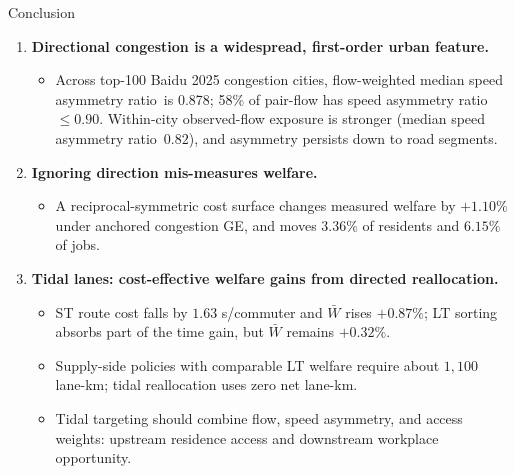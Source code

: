 \documentclass[11pt,aspectratio=169]{beamer}
\newcommand{\good}[1]{\textcolor{blue!70!black}{#1}}
\newcommand{\bad}[1]{\textcolor{red!70!black}{#1}}
\newcommand{\SAR}{speed asymmetry ratio}
\begin{document}
\begin{frame}{Conclusion}
\begin{enumerate}
  \item \textbf{Directional congestion is a widespread, first-order urban feature.}
  \begin{itemize}\footnotesize
    \item Across top-100 Baidu 2025 congestion cities, flow-weighted median \SAR\ is \good{0.878}; \good{58\%} of pair-flow has \SAR\ $\leq0.90$. Within-city observed-flow exposure is stronger (median \SAR\ $0.82$), and asymmetry persists down to road segments.
  \end{itemize}
  \item \textbf{Ignoring direction mis-measures welfare.}
  \begin{itemize}\footnotesize
    \item A reciprocal-symmetric cost surface changes measured welfare by \good{$+1.10\%$} under anchored congestion GE, and moves \good{$3.36\%$} of residents and \good{$6.15\%$} of jobs.
  \end{itemize}
  \item \textbf{Tidal lanes: cost-effective welfare gains from directed reallocation.}
  \begin{itemize}\footnotesize
    \item ST route cost falls by \good{$1.63$ s/commuter} and $\bar W$ rises \good{$+0.87\%$}; LT sorting absorbs part of the time gain, but $\bar W$ remains \good{$+0.32\%$}.
    \item Supply-side policies with comparable LT welfare require about \bad{$1{,}100$ lane-km}; tidal reallocation uses \good{zero net lane-km}.
    \item Tidal targeting should combine flow, speed asymmetry, and access weights: upstream residence access and downstream workplace opportunity.
  \end{itemize}
\end{enumerate}
\end{frame}

\end{document}
